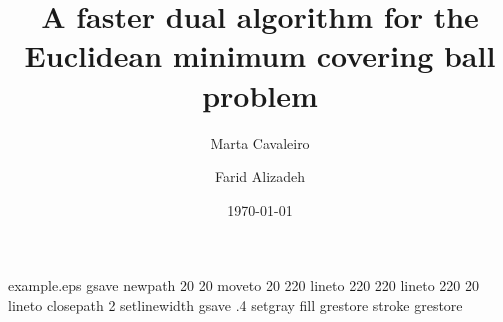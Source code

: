 \begin{filecontents*}{example.eps}
gsave
newpath
  20 20 moveto
  20 220 lineto
  220 220 lineto
  220 20 lineto
closepath
2 setlinewidth
gsave
  .4 setgray fill
grestore
stroke
grestore
\end{filecontents*}

\RequirePackage{fix-cm}

\documentclass{svjour3}                     

\smartqed  

\usepackage{amsmath}
\usepackage{inputenc, theorem,enumerate,fancyhdr,amssymb,amsfonts,rotating,multirow, url, float}

\textwidth=15.5cm \textheight=21.0cm



\title{A faster dual algorithm for the Euclidean minimum covering ball problem
}

\titlerunning{}        

\author{Marta Cavaleiro        \and Farid Alizadeh}



\date{\today}

\maketitle

\begin{abstract}
Dearing and Zeck \cite{Dearing09} presented a dual algorithm for the problem of the minimum covering ball in $^n$. Each iteration of their algorithm has a computational complexity of at least $\mathcal O(n^3)$. In this paper we propose a modification to their algorithm that, together with an implementation that uses updates to the QR factorization of a suitable matrix, achieves a $\mathcal O(n^2)$ iteration. 

\end{abstract}

